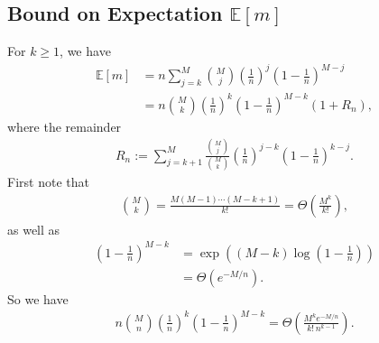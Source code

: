 \documentclass[aps,prx,reprint,superscriptaddress,amsmath,amssymb,longbibliography,floatfix]{revtex4-2}
\newcommand{\dsE}{\mathbb{E}}
\theoremstyle{plain}
\theoremstyle{definition}
\theoremstyle{remark}
\begin{document}


\subsection{Bound on Expectation $\dsE[m]$}
For $k \geq 1$, we have
\begin{align*}
  \dsE [m]
  & = n \sum_{j=k}^{M}
        \binom{M}{j}
        \left(\frac{1}{n}\right)^j
        \left(1-\frac{1}{n}\right)^{M-j}\\
  & = n \binom{M}{k}
        \left(\frac{1}{n}\right)^k
        \left(1-\frac{1}{n}\right)^{M-k}(1 + R_n),   
\end{align*}
where the remainder
\begin{align*}
  R_n
  := \sum_{j=k+1}^{M}
       \frac{\binom{M}{j}}{\binom{M}{k}}
       \left(\frac1n\right)^{j-k}
       \left(1-\frac1n\right)^{k-j}.
\end{align*}
First note that
\begin{align*}
  \binom{M}{k}
  = \frac{M(M-1)\cdots(M-k+1)}{k!}
  = \Theta \left( \frac{M^k}{k!}\right),
\end{align*}
as well as
\begin{align*}
\left(1-\frac{1}{n}\right)^{M-k}
  &= \exp\left(
      (M-k)\log\left(1-\frac{1}{n}\right)
    \right)\\
  &= \Theta \left( e^{-M/n} \right).
\end{align*}
So we have 
\begin{align*}
  n \binom{M}{n}
    \left(\frac{1}{n}\right)^k
    \left(1-\frac{1}{n}\right)^{M-k}
    = \Theta \left( \frac{M^k e^{-M/n}}{k!\,n^{k-1}} \right).
\end{align*}
\end{document}
